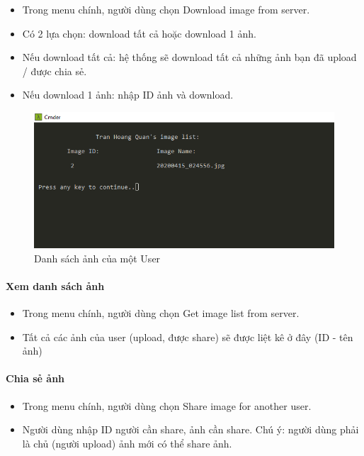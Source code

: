 \documentclass[12pt]{article}
\begin{document}
\begin{itemize}
    \item Trong menu chính, người dùng chọn Download image from server.
    \item Có 2 lựa chọn: download tất cả hoặc download 1 ảnh.
    \item Nếu download tất cả: hệ thống sẽ download tất cả những ảnh bạn đã upload / được chia sẻ.
    \item Nếu download 1 ảnh: nhập ID ảnh và download.
\end{itemize}

\begin{figure}[h]
\centering
\includegraphics[]{list-image.PNG}
\caption{Danh sách ảnh của một User}
\end{figure}

\paragraph{Xem danh sách ảnh}

\begin{itemize}
    \item Trong menu chính, người dùng chọn Get image list from server.
    \item Tất cả các ảnh của user (upload, được share) sẽ được liệt kê ở đây (ID - tên ảnh)
\end{itemize}

\paragraph{Chia sẻ ảnh}

\begin{itemize}
    \item Trong menu chính, người dùng chọn Share image for another user.
    \item Người dùng nhập ID người cần share, ảnh cần share. Chú ý: người dùng phải là chủ (người upload) ảnh mới có thể share ảnh.
\end{itemize}
\end{document}
